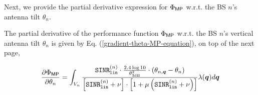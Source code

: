 Next, we provide the partial derivative expression for $\Phi_{{\sf MP}}$ w.r.t. the BS $n$'s antenna tilt $\theta_n$.


\begin{Proposition}\label{gradient-theta-MP}
    The partial derivative of the performance function $\Phi_{{\sf MP}}$ w.r.t. the BS $n$'s vertical antenna tilt $\theta_n$ is given by Eq. (\ref{gradient-theta-MP-equation}), on top of the next page, 
\begin{figure*}[t!]
\begin{multline}\label{gradient-theta-MP-equation}
    \frac{\partial \Phi_{{\sf MP}}}{\partial \theta_n} =   \int_{V_n}  \frac{ \SINR^{(n)}_{\mathtt{lin}} \cdot \frac{2.4 \log 10}{\theta^2_{\textrm{3dB}}} \cdot \left(\theta_{n,\bm{q}} - \theta_n \right)}{\left[\SINR^{(n)}_{\mathtt{lin}} + \nu \right] \cdot \left[ 1 + \mu \left( \SINR^{(n)}_{\mathtt{lin}} + \nu \right) \right] }  \lambda(\bm{q})d\bm{q} \\

\end{multline}
\end{figure*}
\end{Proposition}
